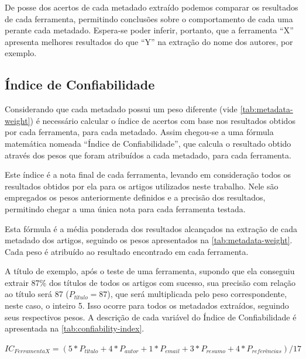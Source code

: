 De posse dos acertos de cada metadado extraído podemos comparar os resultados de cada ferramenta, permitindo conclusões sobre o comportamento de cada uma perante cada metadado. Espera-se poder inferir, portanto, que a ferramenta ``X'' apresenta melhores resultados do que ``Y'' na extração do nome dos autores, por exemplo.

\subsection{Índice de Confiabilidade}
\label{ssec:confiability-index}


Considerando que cada metadado possui um peso diferente (vide \autoref{tab:metadata-weight}) é necessário calcular o índice de acertos com base nos resultados obtidos por cada ferramenta, para cada metadado. Assim chegou-se a uma fórmula matemática nomeada ``Índice de Confiabilidade'', que calcula o resultado obtido através dos pesos que foram atribuídos a cada metadado, para cada ferramenta. 

Este índice é a nota final de cada ferramenta, levando em consideração todos os resultados obtidos por ela para os artigos utilizados neste trabalho. Nele são empregados os pesos anteriormente definidos e a precisão dos resultados, permitindo chegar a uma única nota para cada ferramenta testada.

Esta fórmula é a média ponderada dos resultados alcançados na extração de cada metadado dos artigos, seguindo os pesos apresentados na \autoref{tab:metadata-weight}. Cada peso é atribuído ao resultado encontrado em cada ferramenta. 

A título de exemplo, após o teste de uma ferramenta, supondo que ela conseguiu extrair 87\% dos títulos de todos os artigos com sucesso, sua precisão com relação ao título será 87 ($P_{título}=87$), que será multiplicada pelo peso correspondente, neste caso, o inteiro 5. Isso ocorre para todos os metadados extraídos, seguindo seus respectivos pesos. A descrição de cada variável do Índice de Confiabilidade é apresentada na \autoref{tab:confiability-index}.

\begin{center}
    $ IC_{Ferramenta X}=(5*P_{título}+4*P_{autor}+1*P_{email}+3*P_{resumo}+4*P_{referências}) / 17 $
\end{center}

